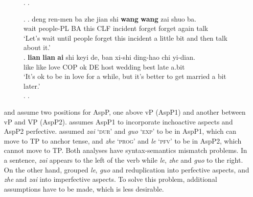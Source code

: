 \documentclass[
a4paper,
10pt,
oneside,
]{scrartcl}
\begin{document}
\begin{figure}
\ex.\label{tree:ramchand}
\scalebox{0.7}{
\begin{forest}
[initP (causing projection) [DP$_3$\\subject of `cause']
  [ [init]
    [procP (process projection)
      [DP$_2$\\subject of `process']
      [[proc]
        [resP (result projection)
        [DP$_1$\\subject of `result']
          [[res] [XP]
          ]
        ]
      ] ]
    ]
  ]
\end{forest} 
}
\z.

\begin{multicols}{2}
\ex.\label{ex:achi}
\ag. deng ren-men ba zhe jian shi \textbf{wang} \textbf{wang} zai shuo ba.\footnotemark\\
wait people-PL BA this CLF incident forget forget again talk\\
 `Let's wait until people forget this incident a little bit and then talk about it.'\\
\bg. \textbf{lian} \textbf{lian} \textbf{ai} shi keyi de, ban xi-shi ding-hao chi yi-dian.\footnotemark\\
like like love COP ok DE host wedding best late {a.bit}\\
`It's ok to be in love for a while, but it's better to get married a bit later.'\\
\z.
\z.

\end{multicols}
\vspace{-2\baselineskip}
\end{figure}


\citet{Travis1999-short, Travis2000-short} and \citet{Tsai2008} assume two positions for AspP, one
above vP (AspP1) and another between vP and VP (AspP2). \citet{Travis1999-short, Travis2000-short}
assumes AspP1 to incorporate inchoactive aspects and AspP2 perfective. \citet{Tsai2008} assumed
\emph{zai} `\textsc{dur}' and \emph{guo} `\textsc{exp}' to be in AspP1, which can move to TP to anchor tense, and
\emph{zhe} `\textsc{prog}' and \emph{le} `\textsc{pfv}' to be in AspP2, which cannot move to TP. Both
analyses have syntax-semantics mismatch problems. In a sentence, \emph{zai} appears to the left of
the verb while \emph{le}, \emph{zhe} and \emph{guo} to the right. On the other hand,
\citet{XiaoMcEnery2004} grouped \emph{le}, \emph{guo} and reduplication into perfective aspects, and
\emph{zhe} and \emph{zai} into imperfective aspects. To solve this problem, additional assumptions
have to be made, which is less desirable. 
\end{document}

